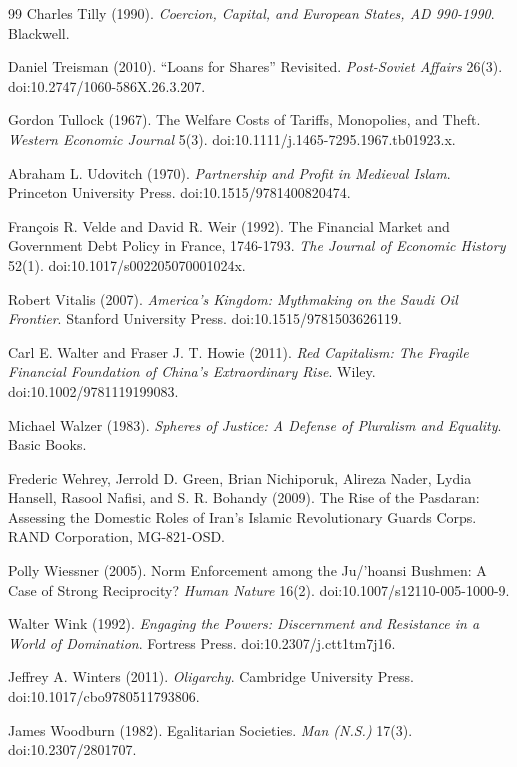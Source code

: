 \documentclass[11pt,letterpaper]{article}
\theoremstyle{definition}
\theoremstyle{remark}
\begin{document}
\begin{thebibliography}{99}
Charles Tilly (1990). \emph{Coercion, Capital, and European States, AD 990-1990}. Blackwell.

Daniel Treisman (2010). ``Loans for Shares'' Revisited. \emph{Post-Soviet Affairs} 26(3). doi:10.2747/1060-586X.26.3.207.

Gordon Tullock (1967). The Welfare Costs of Tariffs, Monopolies, and Theft. \emph{Western Economic Journal} 5(3). doi:10.1111/j.1465-7295.1967.tb01923.x.

Abraham L. Udovitch (1970). \emph{Partnership and Profit in Medieval Islam}. Princeton University Press. doi:10.1515/9781400820474.

Fran\c{c}ois R. Velde and David R. Weir (1992). The Financial Market and Government Debt Policy in France, 1746-1793. \emph{The Journal of Economic History} 52(1). doi:10.1017/s002205070001024x.

Robert Vitalis (2007). \emph{America's Kingdom: Mythmaking on the Saudi Oil Frontier}. Stanford University Press. doi:10.1515/9781503626119.

Carl E. Walter and Fraser J. T. Howie (2011). \emph{Red Capitalism: The Fragile Financial Foundation of China's Extraordinary Rise}. Wiley. doi:10.1002/9781119199083.

Michael Walzer (1983). \emph{Spheres of Justice: A Defense of Pluralism and Equality}. Basic Books.

Frederic Wehrey, Jerrold D. Green, Brian Nichiporuk, Alireza Nader, Lydia Hansell, Rasool Nafisi, and S. R. Bohandy (2009). The Rise of the Pasdaran: Assessing the Domestic Roles of Iran's Islamic Revolutionary Guards Corps. RAND Corporation, MG-821-OSD.

Polly Wiessner (2005). Norm Enforcement among the Ju/'hoansi Bushmen: A Case of Strong Reciprocity? \emph{Human Nature} 16(2). doi:10.1007/s12110-005-1000-9.

Walter Wink (1992). \emph{Engaging the Powers: Discernment and Resistance in a World of Domination}. Fortress Press. doi:10.2307/j.ctt1tm7j16.

Jeffrey A. Winters (2011). \emph{Oligarchy}. Cambridge University Press. doi:10.1017/cbo9780511793806.

James Woodburn (1982). Egalitarian Societies. \emph{Man (N.S.)} 17(3). doi:10.2307/2801707.

\end{thebibliography}
\end{document}
